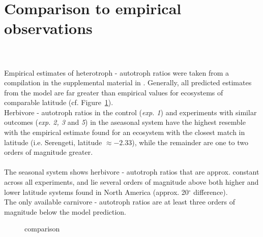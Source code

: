 \section{Comparison to empirical observations}
\\\\
Empirical estimates of heterotroph - autotroph ratios were taken from a compilation in the supplemental material in \cite{Harfoot2014}. Generally, all predicted estimates from the model are far greater than empirical values for ecosystems of comparable latitude (cf. Figure~\ref{fig:chap:res:dyn:ratios}). \\Herbivore - autotroph ratios in the control (\textit{exp. 1}) and experiments with similar outcomes (\textit{exp. 2, 3} and \textit{5}) in the aseasonal system have the highest resemble with the empirical estimate found for an ecosystem with the closest match in latitude (i.e. Serengeti, latitude $  \approx -2.33$), while the remainder are one to two orders of magnitude greater. \\\\
The seasonal system shows herbivore - autotroph ratios that are approx. constant across all experiments, and lie several orders of magnitude above both higher and lower latitude  systems found in North America (approx. 20$^\circ$ difference). \\ 
The only available carnivore - autotroph ratios are at least three orders of magnitude below the model prediction.
\begin{figure}
\centering

\caption[Comparison to empirical data]{comparison}
\label{fig:chap:res:dyn:ratios}
\end{figure}



%